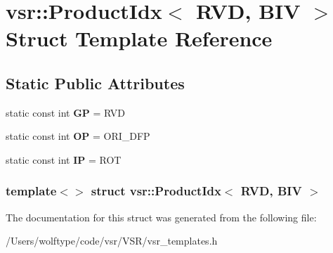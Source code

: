\hypertarget{structvsr_1_1_product_idx_3_01_r_v_d_00_01_b_i_v_01_4}{\section{vsr\-:\-:Product\-Idx$<$ R\-V\-D, B\-I\-V $>$ Struct Template Reference}
\label{structvsr_1_1_product_idx_3_01_r_v_d_00_01_b_i_v_01_4}
}
\subsection*{Static Public Attributes}
\begin{DoxyCompactItemize}
\item 
\hypertarget{structvsr_1_1_product_idx_3_01_r_v_d_00_01_b_i_v_01_4_ac9a2fc0f804c7a25f50afc792769ec0f}{static const int {\bfseries G\-P} = R\-V\-D}\label{structvsr_1_1_product_idx_3_01_r_v_d_00_01_b_i_v_01_4_ac9a2fc0f804c7a25f50afc792769ec0f}

\item 
\hypertarget{structvsr_1_1_product_idx_3_01_r_v_d_00_01_b_i_v_01_4_a53d39ef2069d34402b01855ead42fcbb}{static const int {\bfseries O\-P} = O\-R\-I\-\_\-\-D\-F\-P}\label{structvsr_1_1_product_idx_3_01_r_v_d_00_01_b_i_v_01_4_a53d39ef2069d34402b01855ead42fcbb}

\item 
\hypertarget{structvsr_1_1_product_idx_3_01_r_v_d_00_01_b_i_v_01_4_affa6f0d85addf673031a123cbc49cd7f}{static const int {\bfseries I\-P} = R\-O\-T}\label{structvsr_1_1_product_idx_3_01_r_v_d_00_01_b_i_v_01_4_affa6f0d85addf673031a123cbc49cd7f}

\end{DoxyCompactItemize}
\subsubsection*{template$<$$>$ struct vsr\-::\-Product\-Idx$<$ R\-V\-D, B\-I\-V $>$}



The documentation for this struct was generated from the following file\-:\begin{DoxyCompactItemize}
\item 
/\-Users/wolftype/code/vsr/\-V\-S\-R/vsr\-\_\-templates.\-h\end{DoxyCompactItemize}
